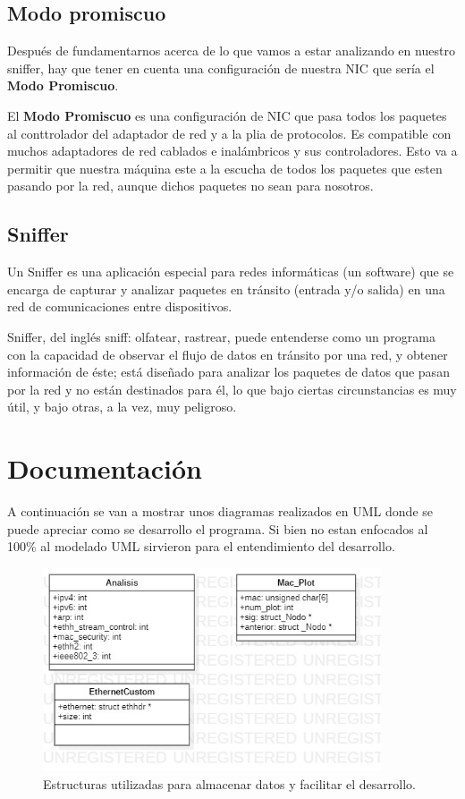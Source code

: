 \documentclass[12pt]{report}
\begin{document}
	\subsection*{Modo promiscuo}
	Después de fundamentarnos acerca de lo que vamos a estar analizando en nuestro sniffer, hay que tener en cuenta una configuración de nuestra NIC que sería el \textbf{Modo Promiscuo}.
	
	El \textbf{Modo Promiscuo} es una configuración de NIC que pasa todos los paquetes al conttrolador del adaptador de red y a la plia de protocolos. Es compatible con muchos adaptadores de red cablados e inalámbricos y sus controladores. Esto va a permitir que nuestra máquina este a la escucha de todos los paquetes que esten pasando por la red, aunque dichos paquetes no sean para nosotros. \cite{web:promiscuo}
	
	\subsection*{Sniffer}
	
	Un Sniffer es una aplicación especial para redes informáticas (un software) que se encarga de capturar y analizar paquetes en tránsito (entrada y/o salida) en una red de comunicaciones entre dispositivos.
	
	Sniffer, del inglés sniff: olfatear, rastrear, puede entenderse como un programa con la capacidad de observar el flujo de datos en tránsito por una red, y obtener información de éste; está diseñado para analizar los paquetes de datos que pasan por la red y no están destinados para él, lo que bajo ciertas circunstancias es muy útil, y bajo otras, a la vez, muy peligroso.\cite{web:sniffer}
	
	\section*{Documentación}
	A continuación se van a mostrar unos diagramas realizados en UML donde se puede apreciar como se desarrollo el programa. Si bien no estan enfocados al 100\% al modelado UML sirvieron para el entendimiento del desarrollo.
	
	\begin{figure}[!h]
		\centering
		\includegraphics[width=10cm]{images/structs.jpg}
		\caption{Estructuras utilizadas para almacenar datos y facilitar el desarrollo.}
	\end{figure}
	
\end{document}
